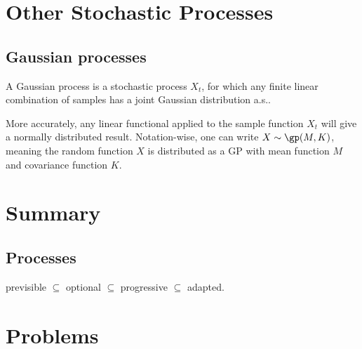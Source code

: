 

\section{Other Stochastic Processes}

\subsection{Gaussian processes}

\begin{definition}\label{def:gaussian_process}
A Gaussian process is a stochastic process $X_t$, for which any finite linear combination of samples has a joint Gaussian distribution a.s..

More accurately, any linear functional applied to the sample function $X_t$ will give a normally distributed result. Notation-wise, one can write $X \sim \gp(M,K)$, meaning the random function $X$ is distributed as a GP with mean function $M$ and covariance function $K$.
\end{definition}

\section{Summary}

\subsection{Processes}

previsible $\subseteq $ optional $\subseteq$  progressive $\subseteq$ adapted.

\section{Problems}



